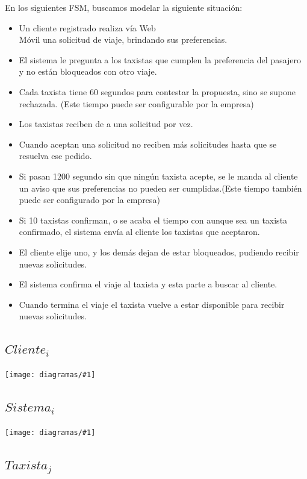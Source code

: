 \documentclass[a4paper, 10pt, twoside]{article}
\newcommand{\diagramav}[1]{%
  \texttt{[image: diagramas/\#1]}%
}
\begin{document}
En los siguientes FSM, buscamos modelar la siguiente situaci\'on:
\begin{itemize}
 \item Un cliente registrado realiza v\'ia Web\\M\'ovil una solicitud de viaje, brindando sus preferencias.
 \item El sistema le pregunta a los taxistas que cumplen la preferencia del pasajero y no est\'an bloqueados con otro viaje.
 \item Cada taxista tiene 60 segundos para contestar la propuesta, sino se supone rechazada. (Este tiempo puede ser configurable por la empresa)
 \item Los taxistas reciben de a una solicitud por vez.
 \item Cuando aceptan una solicitud no reciben m\'as solicitudes hasta que se resuelva ese pedido.
 \item Si pasan 1200 segundo sin que ning\'un taxista acepte, se le manda al cliente un aviso que sus preferencias no pueden ser cumplidas.(Este tiempo tambi\'en puede ser configurado por la empresa)
 \item Si 10 taxistas confirman, o se acaba el tiempo con aunque sea un taxista confirmado, el sistema env\'ia al cliente los taxistas que aceptaron.
 \item El cliente elije uno, y los dem\'as dejan de estar bloqueados, pudiendo recibir nuevas solicitudes.
 \item El sistema confirma el viaje al taxista y esta parte a buscar al cliente.
 \item Cuando termina el viaje el taxista vuelve a estar disponible para recibir nuevas solicitudes.
\end{itemize}


\subsection{$Cliente_i$}
\label{sec:fsm-usuario}

\diagramav{fsm-usuario}

\subsection{$Sistema_i$}
\label{sec:fsm-sistema}

\diagramav{fsm-sistema}

\subsection{$Taxista_j$}
\label{sec:fsm-taxi}
\end{document}
